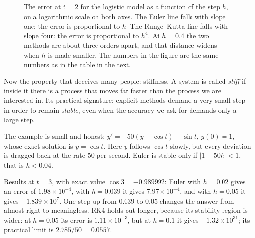 \begin{figure}[htbp]
\centering
{}
\caption{The error at $t=2$ for the logistic model as a function of the step $h$, on a
logarithmic scale on both axes. The Euler line falls with slope one: the error is
proportional to $h$. The Runge--Kutta line falls with slope four:
the error is proportional to $h^{4}$. At $h=0.4$ the two methods are about three
orders apart, and that distance widens when $h$ is made smaller. The numbers in the figure are
the same numbers as in the table in the text.}
\label{fig:galat-numerik}
\end{figure}

Now the property that deceives many people: stiffness. A system
is called \emph{stiff} if inside it there is a process that moves
far faster than the process we are interested in. Its practical signature: explicit methods
demand a very small step in order to remain \emph{stable}, even when the accuracy we ask for
demands only a large step.

The example is small and honest: $y'=-50(y-\cos t)-\sin t$, $y(0)=1$, whose exact
solution is $y=\cos t$. Here $y$ follows $\cos t$ slowly, but every
deviation is dragged back at the rate $50$ per second. Euler is stable only if
$|1-50h|<1$, that is $h<0.04$.

Results at $t=3$, with exact value $\cos3=-0.989992$: Euler with $h=0.02$
gives an error of $1.98\times10^{-4}$, with $h=0.039$ it gives
$7.97\times10^{-4}$, and with $h=0.05$ it gives $-1.839\times10^{7}$. One
step up from $0.039$ to $0.05$ changes the answer from almost right to
meaningless. RK4 holds out longer, because its stability region is wider: at
$h=0.05$ its error is $1.11\times10^{-3}$, but at $h=0.1$ it gives
$-1.32\times10^{31}$; its practical limit is $2.785/50=0.0557$.

